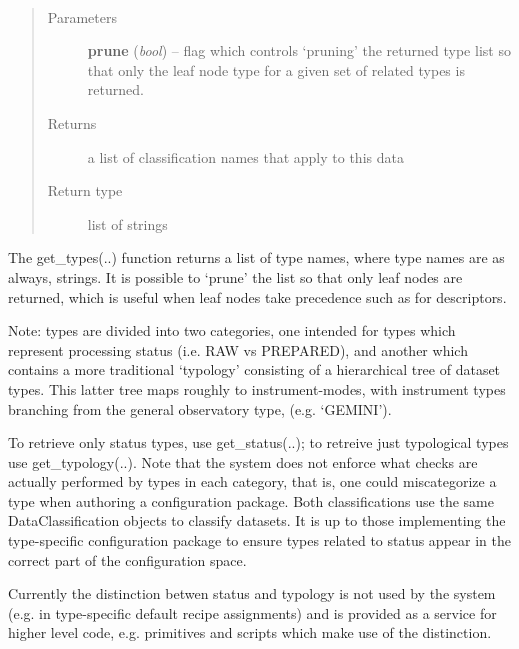\documentclass[letterpaper,10pt,english]{sphinxmanual}
\begin{document}
\begin{fulllineitems}
\label{chapter_AstroDataClass:astrodata.data.AstroData.get_types}~\begin{quote}\begin{description}
\item[{Parameters}] \leavevmode
\textbf{prune} (\emph{bool}) -- flag which controls `pruning' the returned type list 
so that only the leaf node type for a given set of related types
is returned.

\item[{Returns}] \leavevmode
a list of classification names that apply to this data

\item[{Return type}] \leavevmode
list of strings

\end{description}\end{quote}

The get\_types(..) function returns a list of type names, where type 
names are as always, strings. It is possible to `prune' the list so
that only leaf nodes are returned, which is useful when leaf
nodes take precedence such
as for descriptors.

Note: types are divided into two categories, one intended for types
which represent processing status (i.e. RAW vs PREPARED), and another
which contains a more traditional `typology' consisting of a 
hierarchical tree of dataset types. This latter tree maps roughly to
instrument-modes, with instrument types branching from the general
observatory type, (e.g. `GEMINI').

To retrieve only status types, use get\_status(..); to retreive just
typological types use get\_typology(..).  Note that the system does not
enforce what checks are actually performed by types in each category,
that is, one could miscategorize a type when authoring a configuration
package. Both classifications use the same DataClassification objects
to classify datasets. It is up to  those implementing the
type-specific configuration package to ensure types related to status
appear in the correct part of the configuration space.

Currently the distinction betwen status and typology is not used by the
system (e.g. in type-specific default recipe assignments) and is
provided as a service for higher level code, e.g. primitives and
scripts which make use of the distinction.

\end{fulllineitems}
\end{document}
